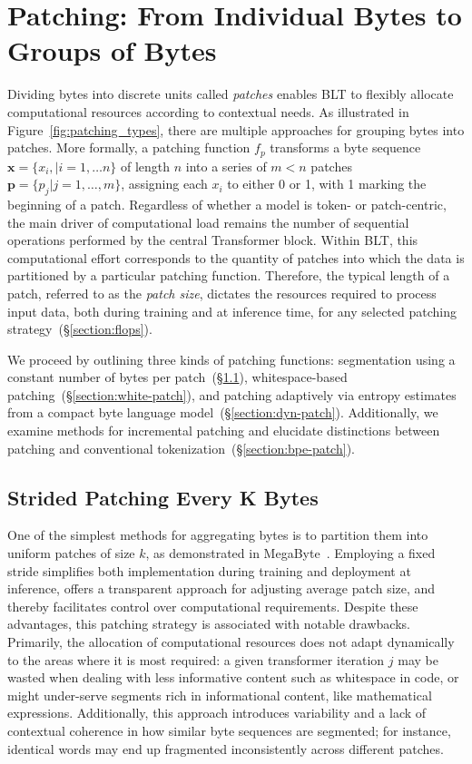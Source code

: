 \section{Patching: From Individual Bytes to Groups of Bytes}
\label{section:patching}

Dividing bytes into discrete units called \textit{patches} enables {\textsc BLT} to flexibly allocate computational resources according to contextual needs. As illustrated in Figure~\ref{fig:patching_types}, there are multiple approaches for grouping bytes into patches. More formally, a patching function $f_p$ transforms a byte sequence $\pmb{x} = \{x_i,|i=1,\ldots n\}$ of length $n$ into a series of $m < n$ patches $\pmb{p} = \{p_j|j=1,\ldots,m\}$, assigning each $x_i$ to either 0 or 1, with 1 marking the beginning of a patch. Regardless of whether a model is token- or patch-centric, the main driver of computational load remains the number of sequential operations performed by the central Transformer block. Within {\textsc BLT}, this computational effort corresponds to the quantity of patches into which the data is partitioned by a particular patching function. Therefore, the typical length of a patch, referred to as the \textit{patch size}, dictates the resources required to process input data, both during training and at inference time, for any selected patching strategy~(\S\ref{section:flops}).

We proceed by outlining three kinds of patching functions: segmentation using a constant number of bytes per patch~(\S\ref{section:static-patch}), whitespace-based patching~(\S\ref{section:white-patch}), and patching adaptively via entropy estimates from a compact byte language model~(\S\ref{section:dyn-patch}). Additionally, we examine methods for incremental patching and elucidate distinctions between patching and conventional tokenization~(\S\ref{section:bpe-patch}).

\subsection{Strided Patching Every K Bytes}
\label{section:static-patch}

One of the simplest methods for aggregating bytes is to partition them into uniform patches of size $k$, as demonstrated in MegaByte~\citep{yu2023megabyte}. Employing a fixed stride simplifies both implementation during training and deployment at inference, offers a transparent approach for adjusting average patch size, and thereby facilitates control over computational requirements. Despite these advantages, this patching strategy is associated with notable drawbacks. Primarily, the allocation of computational resources does not adapt dynamically to the areas where it is most required: a given transformer iteration $j$ may be wasted when dealing with less informative content such as whitespace in code, or might under-serve segments rich in informational content, like mathematical expressions. Additionally, this approach introduces variability and a lack of contextual coherence in how similar byte sequences are segmented; for instance, identical words may end up fragmented inconsistently across different patches.

